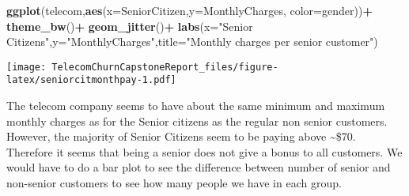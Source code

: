 \documentclass[]{article}
\newenvironment{Shaded}{\begin{snugshade}}{\end{snugshade}}
\newcommand{\KeywordTok}[1]{\textcolor[rgb]{0.13,0.29,0.53}{\textbf{#1}}}
\newcommand{\DataTypeTok}[1]{\textcolor[rgb]{0.13,0.29,0.53}{#1}}
\newcommand{\StringTok}[1]{\textcolor[rgb]{0.31,0.60,0.02}{#1}}
\newcommand{\OperatorTok}[1]{\textcolor[rgb]{0.81,0.36,0.00}{\textbf{#1}}}
\newcommand{\NormalTok}[1]{#1}
\begin{document}
\begin{Shaded}
\begin{Highlighting}[]
\KeywordTok{ggplot}\NormalTok{(telecom,}\KeywordTok{aes}\NormalTok{(}\DataTypeTok{x=}\NormalTok{SeniorCitizen,}\DataTypeTok{y=}\NormalTok{MonthlyCharges, }\DataTypeTok{color=}\NormalTok{gender))}\OperatorTok{+}
\StringTok{  }\KeywordTok{theme_bw}\NormalTok{()}\OperatorTok{+}
\StringTok{  }\KeywordTok{geom_jitter}\NormalTok{()}\OperatorTok{+}
\StringTok{  }\KeywordTok{labs}\NormalTok{(}\DataTypeTok{x=}\StringTok{"Senior Citizens"}\NormalTok{,}\DataTypeTok{y=}\StringTok{"MonthlyCharges"}\NormalTok{,}\DataTypeTok{title=}\StringTok{"Monthly charges per senior customer"}\NormalTok{)}
\end{Highlighting}
\end{Shaded}

\texttt{[image: TelecomChurnCapstoneReport\_files/figure-latex/seniorcitmonthpay-1.pdf]}

The telecom company seems to have about the same minimum and maximum
monthly charges as for the Senior citizens as the regular non senior
customers. However, the majority of Senior Citizens seem to be paying
above \textasciitilde{}\$70. Therefore it seems that being a senior does
not give a bonus to all customers. We would have to do a bar plot to see
the difference between number of senior and non-senior customers to see
how many people we have in each group.
\end{document}
